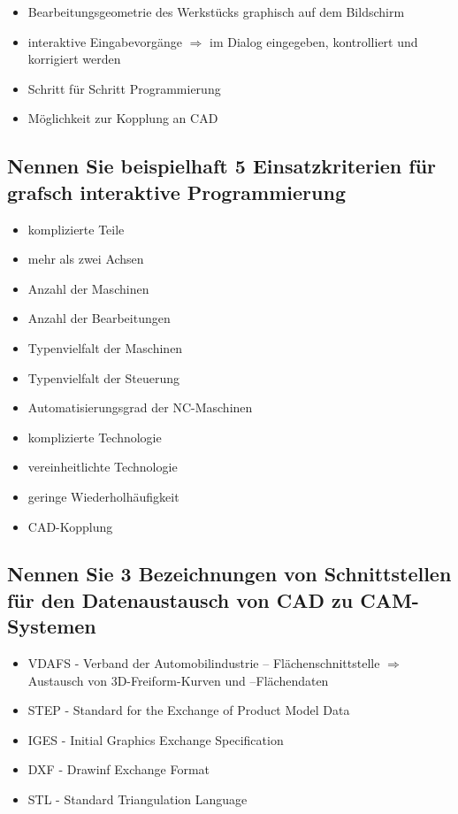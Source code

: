 \begin{itemize}
\item Bearbeitungsgeometrie des Werkstücks graphisch auf dem Bildschirm
\item interaktive Eingabevorgänge $\Rightarrow$ im Dialog eingegeben, kontrolliert 
und korrigiert werden
\item Schritt für Schritt Programmierung
\item Möglichkeit zur Kopplung an CAD
\end{itemize}


\subsection*{Nennen Sie beispielhaft 5 Einsatzkriterien für grafsch interaktive Programmierung}


\begin{itemize}
\item komplizierte Teile 
\item mehr als zwei Achsen 
\item Anzahl der Maschinen 
\item Anzahl der Bearbeitungen 
\item Typenvielfalt der Maschinen 
\item Typenvielfalt der Steuerung 
\item Automatisierungsgrad der NC-Maschinen 
\item komplizierte Technologie
\item vereinheitlichte Technologie 
\item geringe Wiederholhäufigkeit 
\item CAD-Kopplung
\end{itemize}


\subsection*{Nennen Sie 3 Bezeichnungen von Schnittstellen für den Datenaustausch von CAD zu CAM-Systemen}

\begin{itemize}
\item VDAFS - Verband der Automobilindustrie – Flächenschnittstelle $\Rightarrow$ Austausch von 3D-Freiform-Kurven und –Flächendaten 
\item STEP - Standard for the Exchange of Product Model Data 
\item IGES - Initial Graphics Exchange Specification 
\item DXF - Drawinf Exchange Format 
\item STL - Standard Triangulation Language 
\end{itemize}








